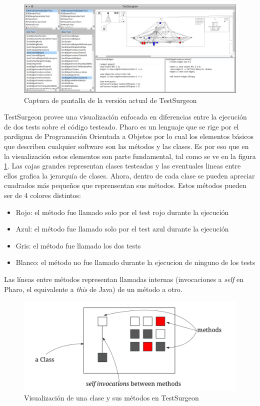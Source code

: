 \documentclass[12pt,spanish,letterpaper]{article}
\begin{document}
\vspace*{0.7 cm}
\begin{figure}[h!]
	\centering
    \includegraphics[scale=0.35]{screenshot_ts.png}
	\caption{Captura de pantalla de la versión actual de TestSurgeon}	
\end{figure}
\vspace*{0.7 cm}

\par TestSurgeon provee una visualización enfocada en diferencias entre la ejecución de dos tests sobre el código testeado. Pharo es un lenguaje que se rige por el pardigma de Programación Orientada a Objetos por lo cual los elementos básicos que describen cualquier software son las métodos y las clases. Es por eso que en la visualización estos elementos son parte fundamental, tal como se ve en la figura \ref{blueprint-cls-mtds}. Las cajas grandes representan clases testeadas y las eventuales lineas entre ellos grafica la jerarquía de clases. Ahora, dentro de cada clase se pueden apreciar cuadrados más pequeños que reprensentan sus métodos. Estos métodos pueden ser de 4 colores distintos:

\begin{itemize}
\item Rojo: el método fue llamado solo por el test rojo durante la ejecución
\item Azul: el método fue llamado solo por el test azul durante la ejecución
\item Gris: el método fue llamado los dos tests
\item Blanco: el método no fue llamado durante la ejecucion de ninguno de los tests
\end{itemize}

Las líneas entre métodos representan llamadas internas (invocaciones a \emph{self} en Pharo, el equivalente a \emph{this} de Java) de un método a otro.

\begin{figure}[h!]
	\centering
    \includegraphics[scale=0.4]{cls_mtds.png}
	\caption{Visualización de una clase y sus métodos en TestSurgeon}	
		\label{blueprint-cls-mtds}
\end{figure}
\end{document}
